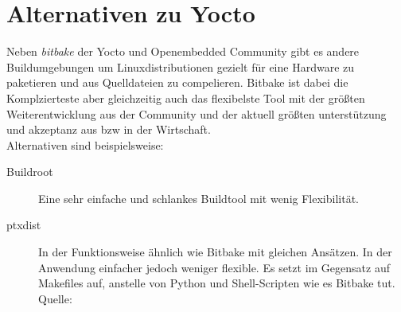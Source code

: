 \section{Alternativen zu Yocto}%
\label{sec:Alternativen zu Yocto}

Neben \textit{bitbake} der Yocto und  Openembedded Community gibt es andere
Buildumgebungen um Linuxdistributionen gezielt für eine Hardware zu paketieren
und aus Quelldateien zu compelieren. Bitbake ist dabei die Komplzierteste aber
gleichzeitig auch das flexibelste Tool mit der größten Weiterentwicklung aus der
Community und der aktuell größten unterstützung und akzeptanz aus bzw in der
Wirtschaft.
\\
Alternativen sind beispielsweise:

\begin{description}
    \item[Buildroot] Eine sehr einfache und schlankes  Buildtool  mit wenig
        Flexibilität. \cite{buildroot}
    \item[ptxdist] In der Funktionsweise ähnlich wie Bitbake mit gleichen
        Ansätzen. In der Anwendung einfacher jedoch weniger flexible. Es setzt im
        Gegensatz auf Makefiles auf, anstelle von Python und Shell-Scripten wie
        es Bitbake tut. Quelle: \cite{ptxdist}
\end{description}









